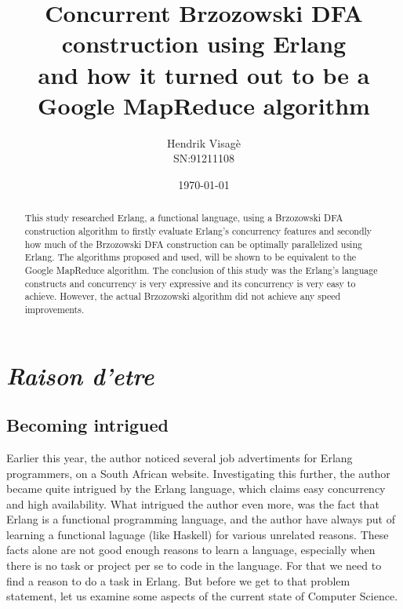 \documentclass[a4paper,11pt]{report}
\author{Hendrik Visag\`e\\SN:91211108}
\title{Concurrent Brzozowski
	DFA construction using Erlang
 \\\small{and how it turned out to be a
		Google MapReduce algorithm}}
\date{\today}
\begin{document}
\maketitle

\begin{abstract}

This study researched Erlang, a functional language, using a
Brzozowski DFA construction algorithm to firstly evaluate Erlang's
concurrency features and secondly how much of the Brzozowski DFA
construction can be optimally parallelized using Erlang.  The
algorithms proposed and used, will be shown to be equivalent to the
Google MapReduce algorithm. The conclusion of this study was the
Erlang's language constructs and concurrency is very expressive and
its concurrency is very easy to achieve. However, the actual
Brzozowski algorithm did not achieve any speed improvements.

\end{abstract}




%

\tableofcontents


\chapter{\textit{Raison d'etre}}

\section{Becoming intrigued}

Earlier this year, the author noticed several job advertiments for
Erlang programmers, on a South African website. Investigating this
further, the author became quite intrigued by the Erlang language,
which claims easy concurrency and high availability.  What intrigued
the author even more, was the fact that Erlang is a functional
programming language, and the author have always put of learning a
functional laguage (like Haskell) for various unrelated reasons. These
facts alone are not good enough reasons to learn a language,
especially when there is no task or project per se to code in the
language. For that we need to find a reason to do a task in
Erlang. But before we get to that problem statement, let us examine
some aspects of the current state of Computer Science.
\end{document}

